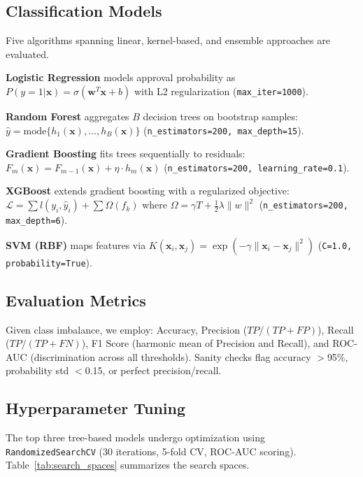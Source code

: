 \documentclass[journal]{IEEEtran}
\begin{document}
\subsection{Classification Models}

Five algorithms spanning linear, kernel-based, and ensemble approaches are evaluated.

\textbf{Logistic Regression} models approval probability as $P(y{=}1|\mathbf{x}) = \sigma(\mathbf{w}^T\mathbf{x} + b)$ with L2 regularization (\texttt{max\_iter=1000}).

\textbf{Random Forest} aggregates $B$ decision trees on bootstrap samples: $\hat{y} = \text{mode}\{h_1(\mathbf{x}), \ldots, h_B(\mathbf{x})\}$ (\texttt{n\_estimators=200, max\_depth=15}).

\textbf{Gradient Boosting} fits trees sequentially to residuals: $F_m(\mathbf{x}) = F_{m-1}(\mathbf{x}) + \eta \cdot h_m(\mathbf{x})$ (\texttt{n\_estimators=200, learning\_rate=0.1}).

\textbf{XGBoost} extends gradient boosting with a regularized objective: $\mathcal{L} = \sum l(y_i, \hat{y}_i) + \sum \Omega(f_k)$ where $\Omega = \gamma T + \frac{1}{2}\lambda\|w\|^2$ (\texttt{n\_estimators=200, max\_depth=6}).

\textbf{SVM (RBF)} maps features via $K(\mathbf{x}_i, \mathbf{x}_j) = \exp(-\gamma\|\mathbf{x}_i - \mathbf{x}_j\|^2)$ (\texttt{C=1.0, probability=True}).


\subsection{Evaluation Metrics}

Given class imbalance, we employ: Accuracy, Precision ($TP/(TP{+}FP)$), Recall ($TP/(TP{+}FN)$), F1 Score (harmonic mean of Precision and Recall), and ROC-AUC (discrimination across all thresholds). Sanity checks flag accuracy $>$95\%, probability std $<$0.15, or perfect precision/recall.


\subsection{Hyperparameter Tuning}

The top three tree-based models undergo optimization using \texttt{RandomizedSearchCV} (30 iterations, 5-fold CV, ROC-AUC scoring). Table~\ref{tab:search_spaces} summarizes the search spaces.
\end{document}
